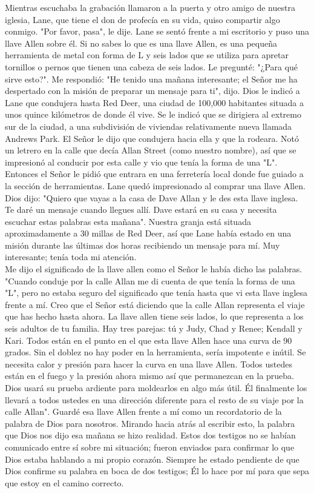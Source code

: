 \documentclass[twoside, 12pt]{book}
\begin{document}
Mientras escuchaba la grabación llamaron a la puerta y otro amigo de nuestra iglesia, Lane, que tiene el don de profecía en su vida, quiso compartir algo conmigo. "Por favor, pasa", le dije. Lane se sentó frente a mi escritorio y puso una llave Allen sobre él. Si no sabes lo que es una llave Allen, es una pequeña herramienta de metal con forma de L y seis lados que se utiliza para apretar tornillos o pernos que tienen una cabeza de seis lados. Le pregunté: "¿Para qué sirve esto?". Me respondió: "He tenido una mañana interesante; el Señor me ha despertado con la misión de preparar un mensaje para ti", dijo. Dios le indicó a Lane que condujera hasta Red Deer, una ciudad de 100,000 habitantes situada a unos quince kilómetros de donde él vive. Se le indicó que se dirigiera al extremo sur de la ciudad, a una subdivisión de viviendas relativamente nueva llamada Andrews Park. El Señor le dijo que condujera hacia ella y que la rodeara. Notó un letrero en la calle que decía Allan Street (como nuestro nombre), así que se impresionó al conducir por esta calle y vio que tenía la forma de una "L". Entonces el Señor le pidió que entrara en una ferretería local donde fue guiado a la sección de herramientas. Lane quedó impresionado al comprar una llave Allen. Dios dijo: "Quiero que vayas a la casa de Dave Allan y le des esta llave inglesa. Te daré un mensaje cuando llegues allí. Dave estará en su casa y necesita escuchar estas palabras esta mañana". Nuestra granja está situada aproximadamente a 30 millas de Red Deer, así que Lane había estado en una misión durante las últimas dos horas recibiendo un mensaje para mí. Muy interesante; tenía toda mi atención.\\

Me dijo el significado de la llave allen como el Señor le había dicho las palabras. "Cuando conduje por la calle Allan me di cuenta de que tenía la forma de una "L", pero no estaba seguro del significado que tenía hasta que vi esta llave inglesa frente a mí. Creo que el Señor está diciendo que la calle Allan representa el viaje que has hecho hasta ahora. La llave allen tiene seis lados, lo que representa a los seis adultos de tu familia. Hay tres parejas: tú y Judy, Chad y Renee; Kendall y Kari. Todos están en el punto en el que esta llave Allen hace una curva de 90 grados. Sin el doblez no hay poder en la herramienta, sería impotente e inútil. Se necesita calor y presión para hacer la curva en una llave Allen. Todos ustedes están en el fuego y la presión ahora mismo así que permanezcan en la prueba. Dios usará su prueba ardiente para moldearlos en algo más útil. Él finalmente los llevará a todos ustedes en una dirección diferente para el resto de su viaje por la calle Allan". Guardé esa llave Allen frente a mí como un recordatorio de la palabra de Dios para nosotros. Mirando hacia atrás al escribir esto, la palabra que Dios nos dijo esa mañana se hizo realidad. Estos dos testigos no se habían comunicado entre sí sobre mi situación; fueron enviados para confirmar lo que Dios estaba hablando a mi propio corazón. Siempre he estado pendiente de que Dios confirme su palabra en boca de dos testigos; Él lo hace por mí para que sepa que estoy en el camino correcto.\\
\end{document}

